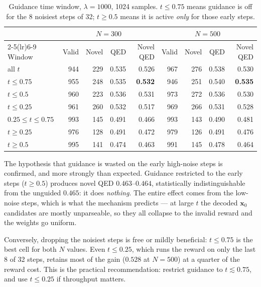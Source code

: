 \documentclass[11pt]{article}
\begin{document}
\begin{table}[h]
\centering
\caption{Guidance time window, $\lambda = 1000$, 1024 samples. $t \le 0.75$
means guidance is off for the 8 noisiest steps of 32; $t \ge 0.5$ means it is
active \emph{only} for those early steps.}
\label{tab:window}
\begin{tabular}{lrrrr rrrr}
\toprule
& \multicolumn{4}{c}{$N = 300$} & \multicolumn{4}{c}{$N = 500$} \\
\cmidrule(lr){2-5}\cmidrule(lr){6-9}
Window & Valid & Novel & QED & Novel QED & Valid & Novel & QED & Novel QED \\
\midrule
all $t$          & 944 & 229 & 0.535 & 0.526 & 967 & 276 & 0.538 & 0.530 \\
$t \le 0.75$     & 955 & 248 & 0.535 & \textbf{0.532} & 946 & 251 & 0.540 & \textbf{0.535} \\
$t \le 0.5$      & 960 & 223 & 0.536 & 0.531 & 973 & 272 & 0.536 & 0.530 \\
$t \le 0.25$     & 961 & 260 & 0.532 & 0.517 & 969 & 266 & 0.531 & 0.528 \\
\midrule
$0.25 \le t \le 0.75$ & 993 & 145 & 0.491 & 0.466 & 993 & 143 & 0.490 & 0.481 \\
$t \ge 0.25$     & 976 & 128 & 0.491 & 0.472 & 979 & 126 & 0.491 & 0.476 \\
$t \ge 0.5$      & 995 & 141 & 0.474 & 0.463 & 991 & 145 & 0.478 & 0.464 \\
\bottomrule
\end{tabular}
\end{table}

The hypothesis that guidance is wasted on the early high-noise steps is
confirmed, and more strongly than expected. Guidance restricted to the early
steps ($t \ge 0.5$) produces novel QED $0.463$--$0.464$, statistically
indistinguishable from the unguided $0.465$: it does \emph{nothing}. The entire
effect comes from the low-noise steps, which is what the mechanism predicts ---
at large $t$ the decoded $\mathbf{x}_0$ candidates are mostly unparseable, so
they all collapse to the invalid reward and the weights go uniform.

Conversely, dropping the noisiest steps is free or mildly beneficial:
$t \le 0.75$ is the best cell for both $N$ values. Even $t \le 0.25$, which runs
the reward on only the last 8 of 32 steps, retains most of the gain
($0.528$ at $N = 500$) at a quarter of the reward cost. This is the practical
recommendation: restrict guidance to $t \lesssim 0.75$, and use $t \le 0.25$ if
throughput matters.
\end{document}
